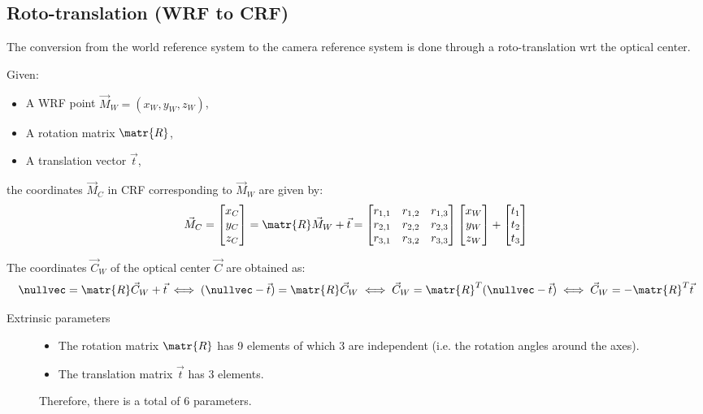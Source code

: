 \subsection{Roto-translation (WRF to CRF)}

The conversion from the world reference system to the camera reference system
is done through a roto-translation wrt the optical center.

Given: 
\begin{itemize}
    \item A WRF point $\vec{M}_W = (x_W, y_W, z_W)$,
    \item A rotation matrix $\matr{R}$,
    \item A translation vector $\vec{t}$,
\end{itemize}
the coordinates $\vec{M}_C$ in CRF corresponding to $\vec{M}_W$ are given by:
\[  
    \vec{M}_C = \begin{bmatrix} x_C \\ y_C \\ z_C \end{bmatrix} =
    \matr{R}\vec{M}_W + \vec{t} =
    \begin{bmatrix}
        r_{1,1} & r_{1,2} & r_{1,3} \\
        r_{2,1} & r_{2,2} & r_{2,3} \\
        r_{3,1} & r_{3,2} & r_{3,3} \\
    \end{bmatrix}
    \begin{bmatrix}
        x_W \\ y_W \\ z_W
    \end{bmatrix}
    +
    \begin{bmatrix}
        t_1 \\ t_2 \\ t_3
    \end{bmatrix}
\]

\begin{remark}
    The coordinates $\vec{C}_W$ of the optical center $\vec{C}$ are obtained as:
    \[ 
        \nullvec = \matr{R}\vec{C}_W + \vec{t} 
            \iff (\nullvec - \vec{t}) = \matr{R}\vec{C}_W 
            \iff \vec{C}_W = \matr{R}^T (\nullvec - \vec{t})
            \iff \vec{C}_W = -\matr{R}^T\vec{t}
    \]
\end{remark}

\begin{description}
    \item[Extrinsic parameters] 
        \phantom{}
        \begin{itemize}
            \item The rotation matrix $\matr{R}$ has 9 elements of which 3 are independent (i.e. the rotation angles around the axes). 
            \item The translation matrix $\vec{t}$ has 3 elements.
        \end{itemize}

        Therefore, there is a total of 6 parameters.
\end{description}


